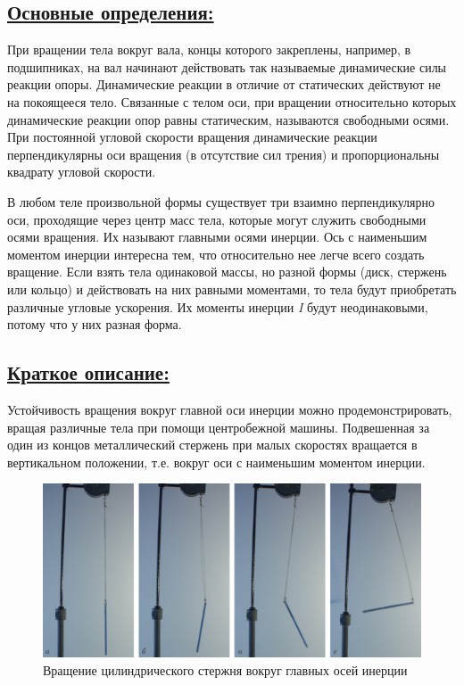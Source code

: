 \documentclass[14pt,a4paper,oneside]{extarticle}	%
\begin{document}
\newpage
\subsection*{\underline{Основные определения:}}

%

При вращении тела вокруг вала, концы которого закреплены, например, в подшипниках, на вал начинают действовать так называемые динамические силы реакции опоры.
Динамические реакции в отличие от статических действуют не на покоящееся тело.
Связанные с телом оси, при вращении относительно которых динамические реакции опор равны статическим, называются свободными осями.
При постоянной угловой скорости вращения динамические реакции перпендикулярны оси вращения (в отсутствие сил трения) и пропорциональны квадрату угловой скорости.

В любом теле произвольной формы существует три взаимно перпендикулярно оси, проходящие через центр масс тела, которые могут служить свободными осями вращения.
Их называют главными осями инерции.
Ось с наименьшим моментом инерции интересна тем, что относительно нее легче всего создать вращение.
Если взять тела одинаковой массы, но разной формы (диск, стержень или кольцо) и действовать на них равными моментами, то тела будут приобретать различные угловые ускорения. 
Их моменты инерции \textit{I} будут неодинаковыми, потому что у них разная форма.

\newpage
\subsection*{\underline{Краткое описание:}}

Устойчивость вращения вокруг главной оси инерции можно продемонстрировать, вращая различные тела при помощи центробежной машины.
Подвешенная за один из концов металлический стержень при малых скоростях вращается в вертикальном положении, т.е. вокруг оси с наименьшим моментом инерции.

\begin{figure}[H] 
	\centering 		
	\includegraphics[width=0.9\linewidth]{freeaxis-2.png}
	\caption{Вращение цилиндрического стержня вокруг главных осей инерции}
	\label{freeaxis-2}
\end{figure}
\end{document}
